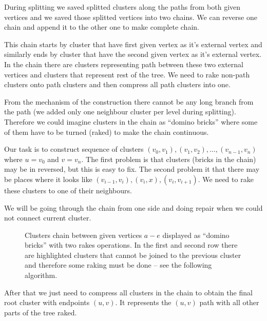 During splitting we saved splitted clusters along the paths from both given
vertices and we saved those splitted vertices into two chains. We can reverse
one chain and append it to the other one to make complete chain.

This chain starts by cluster that have first given vertex as it's external vertex and
similarly ends by cluster that have the second given vertex as it's external
vertex. In the chain there are clusters representing path between these two
external vertices and clusters that represent rest of the tree. We need to rake
non-path clusters onto path clusters and then compress all path clusters into
one.

From the mechanism of the construction there cannot be any long branch from the
path (we added only one neighbour cluster per level during splitting). Therefore
we could imagine clusters in the chain as ``domino bricks'' where some of them
have to be turned (raked) to make the chain continuous.

Our task is to construct sequence of clusters
$(v_0,v_1),(v_1,v_2),\dots,(v_{n-1},v_n)$ where $u=v_0$ and $v=v_n$. The first
problem is that clusters (bricks in the chain) may be in reversed, but this is
easy to fix. The second problem it that there may be places where it looks like
$(v_{i-1}, v_i),(v_i, x),(v_i,v_{i+1})$. We need to rake these clusters to one
of their neighbours.

We will be going through the chain from one side and doing repair when we could
not connect current cluster.

\begin{figure}[h]
\centering
{}
\caption{Clusters chain between given vertices $a-e$ displayed as ``domino bricks''
with two rakes operations. In the first and second row there are highlighted
clusters that cannot be joined to the previous cluster and therefore some raking
must be done -- see the following algorithm.}
\end{figure}

After that we just need to compress all clusters in the chain to obtain the
final root cluster with endpoints $(u,v)$. It represents the $(u,v)$ path with
all other parts of the tree raked.

